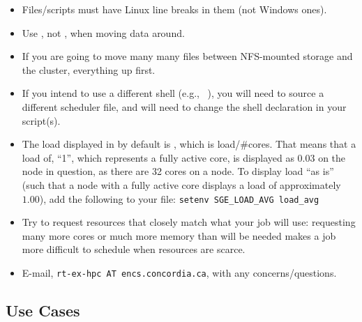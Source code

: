 \documentclass{easychair}
\begin{document}
\begin{itemize}
\item
Files/scripts must have Linux line breaks in them (not Windows ones).
\item
Use , not , when moving data around. 
\item
If you are going to move many many files between NFS-mounted storage and the 
cluster,  everything up first. 
\item
If you intend to use a different shell (e.g., ~\cite{aosa-book-vol1-bash}),
you will need to source a different scheduler file, and will need to 
change the shell declaration in your script(s).
\item
The load displayed in  by default is , which is
load/\#cores. That means that a load of, ``1'', which represents a fully active 
core, is displayed as $0.03$ on the node in question, as there are 32 cores 
on a node. To display load ``as is'' (such that a node with a fully active 
core displays a load of approximately $1.00$), add the following to your
 file: \texttt{setenv SGE\_LOAD\_AVG load\_avg}

\item
Try to request resources that closely match what your job will use: 
requesting many more cores or much more memory than will be needed makes a 
job more difficult to schedule when resources are scarce.

\item
E-mail, \texttt{rt-ex-hpc AT encs.concordia.ca}, with any concerns/questions.
\end{itemize}

\subsection{Use Cases}
\label{sect:cases}
\end{document}
